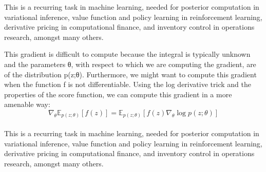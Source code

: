 \documentclass[14pt,a4paper]{report}  %
\begin{document}
This is a recurring task in machine learning, needed for posterior computation in variational inference, value function and policy learning in reinforcement learning, derivative pricing in computational finance, and inventory control in operations research, amongst many others.

This gradient is difficult to compute because the integral is typically unknown and the parameters θ, with respect to which we are computing the gradient, are of the distribution p(z;θ). Furthermore, we might want to compute this gradient when the function f is not differentiable. Using the log derivative trick and the properties of the score function, we can compute this gradient in a more amenable way:\\
$$\nabla_\theta \mathbb{E}_{p(z;\theta)}[f(z)] = \mathbb{E}_{p(z;\theta)}[f(z)\nabla_\theta \log p(z;\theta)]$$\\
This is a recurring task in machine learning, needed for posterior computation in variational inference, value function and policy learning in reinforcement learning, derivative pricing in computational finance, and inventory control in operations research, amongst many others.
\end{document}
